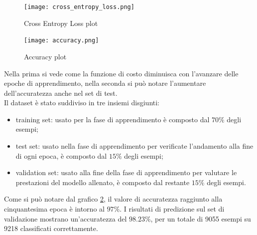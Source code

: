 \begin{figure}
    \centering
    \texttt{[image: cross\_entropy\_loss.png]}
    \caption{Cross Entropy Loss plot}
    \label{fig:cross_entropy_loss_plot}
\end{figure}

\begin{figure}
    \centering
    \texttt{[image: accuracy.png]}
    \caption{Accuracy plot}
    \label{fig:accuracy_plot}
\end{figure}
Nella prima si vede come la funzione di costo diminuisca con l'avanzare delle epoche di apprendimento, nella seconda si può notare l'aumentare dell'accuratezza anche nel set di test.\\
Il dataset è stato suddiviso in tre insiemi disgiunti:
\begin{itemize}
    \item training set: usato per la fase di apprendimento è composto dal $70\%$ degli esempi;
    \item test set: usato nella fase di apprendimento per verificate l'andamento alla fine di ogni epoca, è composto dal $15\%$ degli esempi;
    \item validation set: usato alla fine della fase di apprendimento per valutare le prestazioni del modello allenato, è composto dal restante $15\%$ degli esempi.
\end{itemize}
Come si può notare dal grafico \ref{fig:accuracy_plot}, il valore di accuratezza raggiunto alla cinquantesima epoca è intorno al $97\%$. I risultati di predizione sul set di validazione mostrano un'accuratezza del $98.23\%$, per un totale di 9055 esempi su 9218 classificati correttamente.

